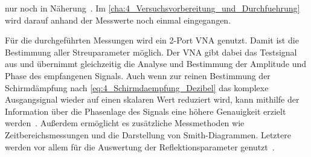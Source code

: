 nur noch in Näherung~\cite{EM_Schirmung}. Im \Abschnitt\ref{cha:4_Versuchsvorbereitung_und_Durchfuehrung} wird darauf anhand der Messwerte noch einmal eingegangen.
\par
\vspace{\linespace}







Für die durchgeführten Messungen wird ein 2-Port VNA genutzt. Damit ist die Bestimmung aller Streuparameter möglich. Der VNA gibt dabei das Testsignal aus und übernimmt gleichzeitig die Analyse und Bestimmung der Amplitude und Phase des empfangenen Signals. Auch wenn zur reinen Bestimmung der Schirmdämpfung nach \Gleichung\eqref{eq:4_Schirmdaempfung_Dezibel} das komplexe Ausgangsignal wieder auf einen skalaren Wert reduziert wird, kann mithilfe der Information über die Phasenlage des Signals eine höhere Genauigkeit erzielt werden~\cite{VNA-Handbuch}. Außerdem ermöglicht es zusätzliche Messmethoden wie Zeitbereichsmessungen und die Darstellung von Smith-Diagrammen. Letztere werden vor allem für die Auswertung der Reflektionsparameter genutzt~\cite{VNA-Handbuch}.




